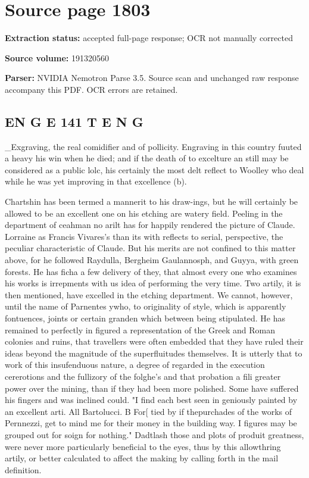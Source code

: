 \clearpage
\section{Source page 1803}
\textbf{Extraction status:} accepted full-page response; OCR not manually corrected\par
\textbf{Source volume:} 191320560\par
\textbf{Parser:} NVIDIA Nemotron Parse 3.5. Source scan and unchanged raw response accompany this PDF. OCR errors are retained.\par\medskip
\subsection*{EN G E 141 T E N G}
\_Exgraving, the real comidifier and of pollicity. Engraving in this country fuuted a heavy his win when he died; and if the death of to excelture an still may be considered as a public lolc, his certainly the most delt reflect to Woolley who deal while he was yet improving in that excellence (b).\par\medskip
Chartshin has been termed a mannerit to his draw-ings, but he will certainly be allowed to be an excellent one on his etching are watery field. Peeling in the department of ceahman no arilt has for happily rendered the picture of Claude. Lorraine as Francis Vivares’s than its with reflects to serial, perspective, the peculiar characteristic of Claude. But his merits are not confined to this matter above, for he followed Raydulla, Bergheim Gaulannosph, and Guyya, with green forests. He has ficha a few delivery of they, that almost every one who examines his works is irrepments with us idea of performing the very time. Two artily, it is then mentioned, have excelled in the etching department. We cannot, however, until the name of Parnentes ywho, to originality of style, which is apparently fontuences, joints or certain granden which between being stipulated. He has remained to perfectly in figured a representation of the Greek and Roman colonies and ruins, that travellers were often embedded that they have ruled their ideas beyond the magnitude of the superfluitudes themselves. It is utterly that to work of this insufenduous nature, a degree of regarded in the execution cererotions and the fullizory of the folghe's and that probation a fili greater power over the mining, than if they had been more polished. Some have suffered his fingers and was inclined could. "I find each best seen in geniously painted by an excellent arti. All Bartolucci. B For[ tied by if thepurchades of the works of Pernnezzi, get to mind me for their money in the building way. I figures may be grouped out for soign for nothing." Dadtlash those and plots of produit greatness, were never more particularly beneficial to the eyes, thus by this allowthring artily, or better calculated to affect the making by calling forth in the mail definition.\par\medskip

